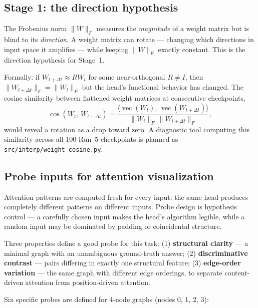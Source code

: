 \documentclass[11pt, a4paper]{article}
\begin{document}
\subsection{Stage 1: the direction hypothesis}
\label{sec:stage1-direction}

The Frobenius norm $\|W\|_F$ measures the \emph{magnitude} of a weight matrix
but is blind to its \emph{direction}. A weight matrix can rotate --- changing
which directions in input space it amplifies --- while keeping $\|W\|_F$
exactly constant. This is the direction hypothesis for Stage~1.

Formally: if $W_{t+\Delta t} \approx R W_t$ for some near-orthogonal $R \neq I$,
then $\|W_{t+\Delta t}\|_F = \|W_t\|_F$ but the head's functional behavior has
changed. The cosine similarity between flattened weight matrices at consecutive
checkpoints,
\[
  \cos(W_t,\, W_{t+\Delta t})
  = \frac{\langle \operatorname{vec}(W_t),\, \operatorname{vec}(W_{t+\Delta t})\rangle}
         {\|W_t\|_F\,\|W_{t+\Delta t}\|_F},
\]
would reveal a rotation as a drop toward zero. A diagnostic tool computing
this similarity across all 100 Run~5 checkpoints is planned as
\texttt{src/interp/weight\_cosine.py}.

\subsection{Probe inputs for attention visualization}
\label{sec:probes}

Attention patterns are computed fresh for every input: the same head produces
completely different patterns on different inputs. Probe design is hypothesis
control --- a carefully chosen input makes the head's algorithm legible, while
a random input may be dominated by padding or coincidental structure.

Three properties define a good probe for this task: (1) \textbf{structural
clarity} --- a minimal graph with an unambiguous ground-truth answer;
(2) \textbf{discriminative contrast} --- pairs differing in exactly one
structural feature; (3) \textbf{edge-order variation} --- the same graph
with different edge orderings, to separate content-driven attention from
position-driven attention.

Six specific probes are defined for 4-node graphs (nodes 0, 1, 2, 3):
\end{document}
